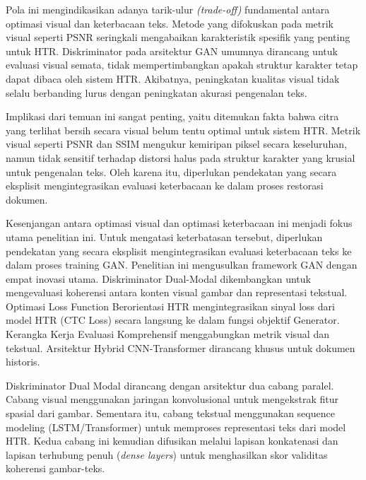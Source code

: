 \documentclass[12pt,a4paper]{article}
\begin{document}
\vspace{0.8em}
Pola ini mengindikasikan adanya tarik-ulur \textit{(trade-off)}  fundamental antara optimasi visual dan keterbacaan teks. Metode yang difokuskan pada metrik visual seperti PSNR seringkali mengabaikan karakteristik spesifik yang penting untuk HTR. Diskriminator pada arsitektur GAN umumnya dirancang untuk evaluasi visual semata, tidak mempertimbangkan apakah struktur karakter tetap dapat dibaca oleh sistem HTR. Akibatnya, peningkatan kualitas visual tidak selalu berbanding lurus dengan peningkatan akurasi pengenalan teks.

\vspace{0.8em}
Implikasi dari temuan ini sangat penting, yaitu ditemukan fakta bahwa  citra yang terlihat bersih secara visual belum tentu optimal untuk sistem HTR. Metrik visual seperti PSNR dan SSIM mengukur kemiripan piksel secara keseluruhan, namun tidak sensitif terhadap distorsi halus pada struktur karakter yang krusial untuk pengenalan teks. Oleh karena itu, diperlukan pendekatan yang secara eksplisit mengintegrasikan evaluasi keterbacaan ke dalam proses restorasi dokumen.

\vspace{0.5cm}  %
Kesenjangan antara optimasi visual dan optimasi keterbacaan ini menjadi fokus utama penelitian ini. Untuk mengatasi keterbatasan tersebut, diperlukan pendekatan yang secara eksplisit mengintegrasikan evaluasi keterbacaan teks ke dalam proses training GAN. Penelitian ini mengusulkan framework GAN dengan empat inovasi utama. Diskriminator Dual-Modal dikembangkan untuk mengevaluasi koherensi antara konten visual gambar dan representasi tekstual. Optimasi Loss Function Berorientasi HTR mengintegrasikan sinyal loss dari model HTR (CTC Loss) secara langsung ke dalam fungsi objektif Generator. Kerangka Kerja Evaluasi Komprehensif menggabungkan metrik visual dan tekstual. Arsitektur Hybrid CNN-Transformer dirancang khusus untuk dokumen historis.

\vspace{0.8em}
Diskriminator Dual Modal dirancang dengan arsitektur dua cabang paralel. Cabang visual menggunakan jaringan konvolusional untuk mengekstrak fitur spasial dari gambar. Sementara itu, cabang tekstual menggunakan sequence modeling (LSTM/Transformer) untuk memproses representasi teks dari model HTR. Kedua cabang ini kemudian difusikan melalui lapisan konkatenasi dan lapisan terhubung penuh (\textit{dense layers}) untuk menghasilkan skor validitas koherensi gambar-teks.
\end{document}
